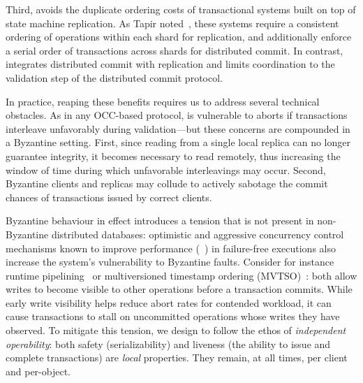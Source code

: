 Third, \sys{} avoids the duplicate ordering costs of transactional systems
built on top of state machine replication. As Tapir noted~\cite{zhang2015tapir,mu2016consolidating},
these systems require a consistent ordering of
operations within each shard for replication, and additionally enforce a serial order of transactions across
shards for distributed commit. In contrast, \sys{} integrates distributed commit with 
replication and
limits coordination to the validation step of the distributed commit
protocol. %

In practice, reaping these benefits requires us to address several
technical obstacles. As in  any OCC-based protocol, \sys
is vulnerable to aborts if transactions interleave unfavorably during
validation---but these concerns are compounded in a Byzantine
setting. First, since reading from a single local replica can no
longer guarantee integrity, it becomes necessary to read remotely,
thus increasing the window of time during which unfavorable interleavings may occur. Second, Byzantine clients and replicas may
collude to actively sabotage the commit chances of transactions issued
by correct clients. 

Byzantine behaviour in effect introduces a tension that is not present in non-Byzantine
distributed databases: optimistic and aggressive concurrency control mechanisms known
to improve performance (~\cite{kung1981occ,bernstein1983mcc,reed1983atomic,xie2015callas,zhang2015tapir}) in failure-free executions also increase the system's vulnerability to Byzantine faults. Consider for instance runtime pipelining~\cite{xie2015callas,su2017tebaldi} or multiversioned timestamp ordering (MVTSO)~\cite{bernstein1983mcc,reed1983atomic}: both allow writes to become visible to other operations before a transaction commits. While early write visibility helps reduce abort rates for
contended workload, it can cause transactions to stall on uncommitted operations whose writes they have observed. To mitigate this tension, we design \sys{} to follow the ethos of \textit{independent operability}: both safety (serializability) and liveness (the ability to issue and complete transactions) are \textit{local} properties. They remain, at all times, per client and per-object.  


